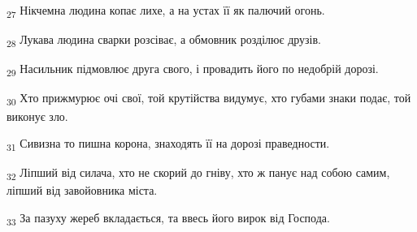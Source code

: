 \begin{tcolorbox}
\textsubscript{27} Нікчемна людина копає лихе, а на устах її як палючий огонь.
\end{tcolorbox}
\begin{tcolorbox}
\textsubscript{28} Лукава людина сварки розсіває, а обмовник розділює друзів.
\end{tcolorbox}
\begin{tcolorbox}
\textsubscript{29} Насильник підмовлює друга свого, і провадить його по недобрій дорозі.
\end{tcolorbox}
\begin{tcolorbox}
\textsubscript{30} Хто прижмурює очі свої, той крутійства видумує, хто губами знаки подає, той виконує зло.
\end{tcolorbox}
\begin{tcolorbox}
\textsubscript{31} Сивизна то пишна корона, знаходять її на дорозі праведности.
\end{tcolorbox}
\begin{tcolorbox}
\textsubscript{32} Ліпший від силача, хто не скорий до гніву, хто ж панує над собою самим, ліпший від завойовника міста.
\end{tcolorbox}
\begin{tcolorbox}
\textsubscript{33} За пазуху жереб вкладається, та ввесь його вирок від Господа.
\end{tcolorbox}
